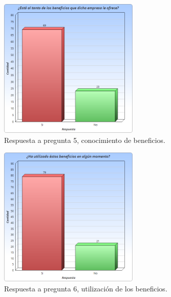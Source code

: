 \begin{figure}[!htb]
    \centering
    \includegraphics[width=0.6\textwidth]{images/Graficos/graf_5_3.png}
    \caption[Gráfico pregunta 5, conocimiento de beneficios.]{Respuesta a pregunta 5, conocimiento de beneficios.}
    \label{fig:chart5.3}
\end{figure}

\begin{figure}[!htb]
    \centering
    \includegraphics[width=0.6\textwidth]{images/Graficos/graf_5_4.png}
    \caption[Gráfico pregunta 6, utilización de los beneficios.]{Respuesta a pregunta 6, utilización de los beneficios.}
    \label{fig:chart5.4}
\end{figure}

